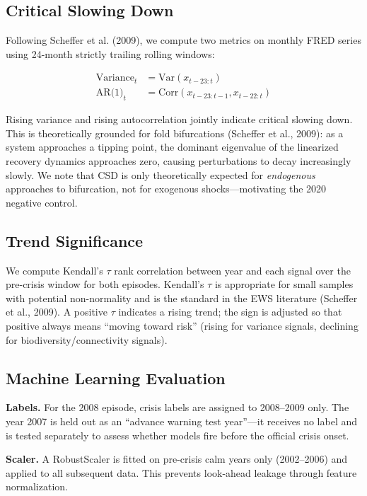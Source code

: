\documentclass[12pt,a4paper]{article}
\begin{document}
\subsection{Critical Slowing Down}

Following Scheffer et al. (2009), we compute two metrics on monthly FRED series using
24-month strictly trailing rolling windows:

\begin{align}
\text{Variance}_t &= \text{Var}(x_{t-23:t}) \\
\text{AR(1)}_t &= \text{Corr}(x_{t-23:t-1}, x_{t-22:t})
\end{align}

Rising variance and rising autocorrelation jointly indicate critical slowing down.
This is theoretically grounded for fold bifurcations (Scheffer et al., 2009): as a system
approaches a tipping point, the dominant eigenvalue of the linearized recovery dynamics
approaches zero, causing perturbations to decay increasingly slowly. We note that CSD
is only theoretically expected for \textit{endogenous} approaches to bifurcation, not
for exogenous shocks---motivating the 2020 negative control.

\subsection{Trend Significance}

We compute Kendall's $\tau$ rank correlation between year and each signal over the
pre-crisis window for both episodes. Kendall's $\tau$ is appropriate for small samples
with potential non-normality and is the standard in the EWS literature (Scheffer et al., 2009).
A positive $\tau$ indicates a rising trend; the sign is adjusted so that positive always means
``moving toward risk'' (rising for variance signals, declining for biodiversity/connectivity signals).

\subsection{Machine Learning Evaluation}

\textbf{Labels.} For the 2008 episode, crisis labels are assigned to 2008--2009 only.
The year 2007 is held out as an ``advance warning test year''---it receives no label
and is tested separately to assess whether models fire before the official crisis onset.

\textbf{Scaler.} A RobustScaler is fitted on pre-crisis calm years only (2002--2006)
and applied to all subsequent data. This prevents look-ahead leakage through feature
normalization.
\end{document}

